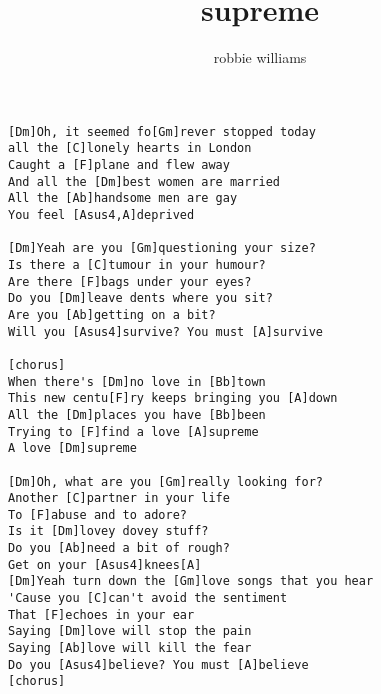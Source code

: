 \author{robbie williams}
\title{supreme}
\maketitle
\begin{verbatim}
[Dm]Oh, it seemed fo[Gm]rever stopped today
all the [C]lonely hearts in London
Caught a [F]plane and flew away
And all the [Dm]best women are married
All the [Ab]handsome men are gay    
You feel [Asus4,A]deprived

[Dm]Yeah are you [Gm]questioning your size?
Is there a [C]tumour in your humour?
Are there [F]bags under your eyes?
Do you [Dm]leave dents where you sit?
Are you [Ab]getting on a bit?
Will you [Asus4]survive? You must [A]survive

[chorus]
When there's [Dm]no love in [Bb]town
This new centu[F]ry keeps bringing you [A]down
All the [Dm]places you have [Bb]been
Trying to [F]find a love [A]supreme
A love [Dm]supreme

[Dm]Oh, what are you [Gm]really looking for?
Another [C]partner in your life
To [F]abuse and to adore?
Is it [Dm]lovey dovey stuff?
Do you [Ab]need a bit of rough?
Get on your [Asus4]knees[A]
[Dm]Yeah turn down the [Gm]love songs that you hear
'Cause you [C]can't avoid the sentiment
That [F]echoes in your ear
Saying [Dm]love will stop the pain
Saying [Ab]love will kill the fear
Do you [Asus4]believe? You must [A]believe
[chorus]
\end{verbatim}